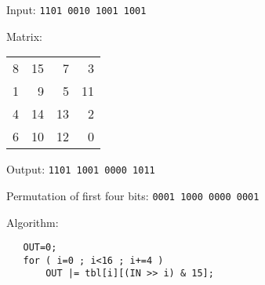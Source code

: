
\topmargin      -1.0cm
\oddsidemargin   0.0cm
\evensidemargin  0.0cm
\textwidth       6.5in
\textheight      9.0in



\Large

Input: \verb+1101 0010 1001 1001+ 

\vskip 0.5in

Matrix:

\begin{tabular}{r r r r}
   8 & 15 &  7 &  3 \\
   1 &  9 &  5 & 11 \\
   4 & 14 & 13 &  2 \\
   6 & 10 & 12 &  0 \\
\end{tabular}

\vskip 0.5in

Output: \verb+1101 1001 0000 1011+

\vskip 0.5in

Permutation of first four bits: \verb+0001 1000 0000 0001+

\vskip 0.5in

Algorithm:

\begin{verbatim}
   OUT=0;
   for ( i=0 ; i<16 ; i+=4 )
       OUT |= tbl[i][(IN >> i) & 15];
\end{verbatim}


